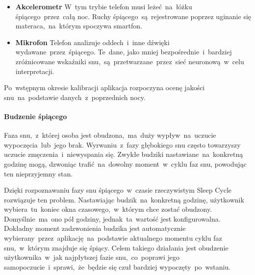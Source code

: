 \begin{itemize}
	\item {\bf Akcelerometr} W~tym trybie telefon musi leżeć~na~łóżku śpiącego~przez~całą noc. Ruchy śpiącego~są~rejestrowane poprzez uginanie się materaca,~na~którym spoczywa smartfon.
	\item {\bf Mikrofon} Telefon analizuje oddech~i~inne dźwięki wydawane~przez~śpiącego. Te~dane, jako mniej bezpośrednie~i~bardziej zróżnicowane wskaźniki snu,~są~przetwarzane~przez~sieć neuronową~w~celu interpretacji.
\end{itemize}

\noindent Po~wstępnym okresie kalibracji aplikacja rozpoczyna ocenę jakości snu~na~podstawie danych~z~poprzednich nocy.

\bigskip
{}

\paragraph{Budzenie śpiącego}
Faza snu,~z~której osoba jest obudzona,~ma~duży wypływ~na~uczucie wypoczęcia~lub~jego brak. Wyrwaniu~z~fazy głębokiego snu często towarzyszy uczucie zmęczenia~i~niewyspania się. Zwykłe budziki nastawiane~na~konkretną godzinę mogą, dzwoniąc trafić~na~dowolny moment~w~cyklu faz snu, powodując ten nieprzyjemny stan. 

Dzięki rozpoznawaniu fazy snu śpiącego~w~czasie rzeczywistym Sleep Cycle rozwiązuje ten problem. Nastawiając budzik~na~konkretną godzinę, użytkownik wybiera~tu~koniec okna czasowego,~w~którym chce zostać obudzony. Domyślnie~ma~ono pół godziny, jednak~ta~wartość jest konfigurowalna. Dokładny moment zadzwonienia budzika jest automatycznie wybierany~przez~aplikację~na~podstawie aktualnego momentu cyklu faz snu,~w~którym znajduje się śpiący. Celem takiego działania jest obudzenie użytkownika~w~jak najpłytszej fazie snu,~co~poprawi jego samopoczucie~i~sprawi,~że~będzie się czuł bardziej wypoczęty~po~wstaniu.
